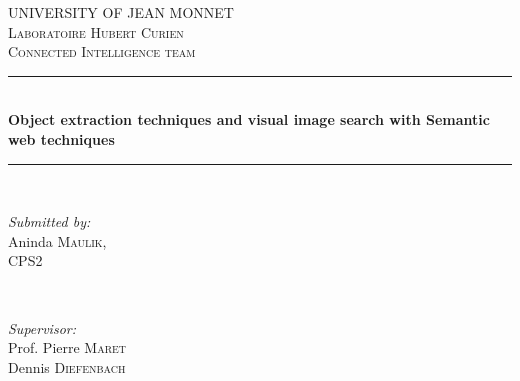 \documentclass[12pt]{article}
\begin{document}
 

\begin{titlepage}

\newcommand{\HRule}{\rule{\linewidth}{0.5mm}} %

\center %
 

\textsc{\LARGE UNIVERSITY OF JEAN MONNET\\ [1cm]} %
\textsc{\Large Laboratoire Hubert Curien}\\[0.5cm] %
\textsc{\large Connected Intelligence team}\\[0.5cm] %


\HRule \\[0.4cm]
{ \huge \bfseries Object extraction techniques and visual image search with Semantic web techniques}\\[0.4cm] %
\HRule \\[1.5cm]
 

\begin{minipage}{0.4\textwidth}
\begin{flushleft} \large
\emph{Submitted by:}\\
Aninda \textsc{Maulik,}\\ %
CPS2
\end{flushleft}
\end{minipage}
~
\begin{minipage}{0.4\textwidth}
\begin{flushright} \large
\emph{Supervisor:} \\
Prof. Pierre  \textsc{Maret}\\ %
Dennis  \textsc{Diefenbach}\\



\end{flushright}
\end{minipage}
\end{titlepage}
\end{document}
